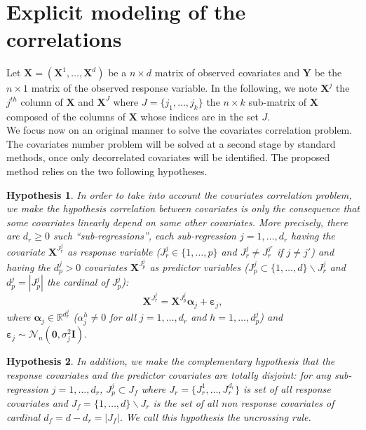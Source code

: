 \documentclass[12pt,a4paper]{report}
\newtheorem{hyp}{Hypothesis}
\begin{document}
\section{Explicit modeling of the correlations}
	Let $\boldsymbol{X}=(\boldsymbol{X}^1,\dots,\boldsymbol{X}^d)$ be a $n \times d$ matrix of observed covariates and $\boldsymbol{Y}$ be the $n \times 1$ matrix of the observed response variable. In the following, we note $\boldsymbol{X}^j$ the $j^{th}$ column of $\boldsymbol{X}$ and $\boldsymbol{X}^{J}$ where $J=\{j_1,\dots,j_k\}$ the $n\times k$ sub-matrix of $\boldsymbol{X}$ composed of the columns of $\boldsymbol{X}$ whose indices are in the set $J$. 
\\




We focus now on an original manner to solve the covariates correlation problem. The covariates number problem will be solved at a second stage by standard methods, once only decorrelated covariates will be identified. The proposed method relies on the two following hypotheses.

\begin{hyp}\label{H1}
In order to take into account the covariates correlation problem, we make the hypothesis correlation between covariates is {\it only} the consequence that some covariates {\it linearly} depend on some other covariates. More precisely, there are $d_{r}\geq 0$ such ``sub-regressions'', each sub-regression $j=1,\ldots,d_{r}$ having the covariate $\boldsymbol{X}^{J_{r}^j}$ as {\it response} variable ($J_{r}^j\in\{1,\ldots,p\}$ and $J_{r}^j\neq J_{r}^{j'}$ if $j\neq j'$) and having the $d_p^j>0$ covariates $\boldsymbol{X}^{J_{p}^j}$  as {\it predictor} variables ($J_{p}^j\subset\{1,\ldots,d\} \backslash J_{r}^j$ and $d_p^j=|J_{p}^j|$ the cardinal of $J_{p}^j$):
\begin{equation}
\boldsymbol{X}^{J_{r}^j}%
=\boldsymbol{X}^{J_{p}^j}\boldsymbol{\alpha}_j+\boldsymbol{\varepsilon}_j, \label{eq:SR}
\end{equation}
where $\boldsymbol{\alpha}_j\in{\mathbb{R}^{d_r^j}}$ (${\alpha}_j^h\neq 0$ for all $j=1,\ldots,d_r$ and $h=1,\ldots,d_p^j$) and $\boldsymbol{\varepsilon}_j \sim\mathcal{N}_n(\boldsymbol{0},\sigma^2_j\boldsymbol{I})$.
\end{hyp}

\begin{hyp}\label{H2}
In addition, we make the complementary hypothesis that the response covariates and the predictor covariates are totally disjoint: for any sub-regression $j=1,\ldots,d_{r}$, $J_{p}^j\subset J_f$ where $J_{r}=\{J_{r}^1,\ldots,J_{r}^{d_r}\}$ is set of all response covariates and $J_f=\{1,\ldots,d\} \backslash J_{r}$ is the set of all {\it non} response covariates of cardinal $d_f=d-d_r=|J_f|$. We call this hypothesis the uncrossing rule.
\end{hyp}
\end{document}
